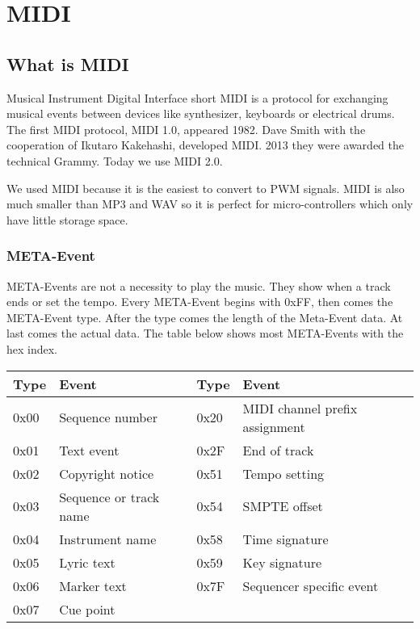 \setchapterpreamble[u]{\margintoc}

\chapter{MIDI}

\section{What is MIDI}

Musical Instrument Digital Interface short MIDI is a protocol for exchanging musical events between devices like synthesizer, keyboards or electrical drums. The first MIDI protocol, MIDI 1.0, appeared 1982. Dave Smith with the cooperation of Ikutaro Kakehashi, developed MIDI. 2013 they were awarded the technical Grammy. Today we use MIDI 2.0.

We used MIDI because it is the easiest to convert to PWM signals. MIDI is also much smaller than MP3 and WAV so it is perfect for micro-controllers which only have little storage space.

\subsection{META-Event}

META-Events are not a necessity to play the music. They show when a track ends or set the tempo. Every META-Event begins with 0xFF, then comes the META-Event type. After the type comes the length of the Meta-Event data. At last comes the actual data. The table below shows most META-Events with the hex index.

\begin{tabular}{|l|l|l|l|}
    \hline
        Type & Event & Type & Event \\ \hline
        0x00 & Sequence number & 0x20 & MIDI channel prefix assignment \\ \hline
        0x01 & Text event & 0x2F & End of track \\ \hline
        0x02 & Copyright notice & 0x51 & Tempo setting \\ \hline
        0x03 & Sequence or track name & 0x54 & SMPTE offset \\ \hline
        0x04 & Instrument name & 0x58 & Time signature \\ \hline
        0x05 & Lyric text & 0x59 & Key signature \\ \hline
        0x06 & Marker text & 0x7F & Sequencer specific event \\ \hline
        0x07 & Cue point & ~ & ~ \\ \hline
    \end{tabular}



